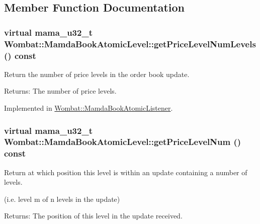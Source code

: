 \subsection{Member Function Documentation}
\hypertarget{classWombat_1_1MamdaBookAtomicLevel_9b93f1c575fa54e72ce1da2d81034bb7}{
\subsubsection[getPriceLevelNumLevels]{\setlength{\rightskip}{0pt plus 5cm}virtual mama\_\-u32\_\-t Wombat::Mamda\-Book\-Atomic\-Level::get\-Price\-Level\-Num\-Levels () const}}
\label{classWombat_1_1MamdaBookAtomicLevel_9b93f1c575fa54e72ce1da2d81034bb7}


Return the number of price levels in the order book update. 

\begin{Desc}
\item[Returns:]The number of price levels. \end{Desc}


Implemented in \hyperlink{classWombat_1_1MamdaBookAtomicListener_b7b3fe18e82667b4ab2db1b10c535b30}{Wombat::Mamda\-Book\-Atomic\-Listener}.\hypertarget{classWombat_1_1MamdaBookAtomicLevel_9805eb2f6cd0313e9923070c2f50bf1a}{
\subsubsection[getPriceLevelNum]{\setlength{\rightskip}{0pt plus 5cm}virtual mama\_\-u32\_\-t Wombat::Mamda\-Book\-Atomic\-Level::get\-Price\-Level\-Num () const}}
\label{classWombat_1_1MamdaBookAtomicLevel_9805eb2f6cd0313e9923070c2f50bf1a}


Return at which position this level is within an update containing a number of levels. 

(i.e. level m of n levels in the update)

\begin{Desc}
\item[Returns:]The position of this level in the update received. \end{Desc}


